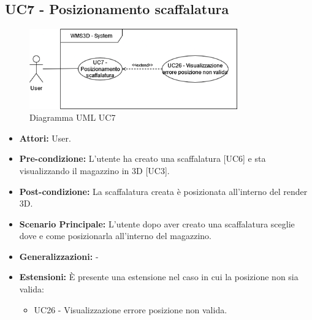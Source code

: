 \subsection{UC7 - Posizionamento scaffalatura}
\begin{figure}[H]
  \centering
  \includegraphics[width=0.8\textwidth]{UC_diagrams_1-10/UC7.drawio.png}
   \caption{Diagramma UML UC7}
\end{figure}
\begin{itemize}
    \item \textbf{Attori:} User.
    \item \textbf{Pre-condizione:}  L'utente ha creato una scaffalatura [UC6] e sta visualizzando il magazzino in 3D [UC3].
    \item \textbf{Post-condizione:} La scaffalatura creata è posizionata all'interno del render 3D.
    \item \textbf{Scenario Principale:} L'utente dopo aver creato una scaffalatura sceglie dove e come posizionarla all'interno del magazzino.
    \item \textbf{Generalizzazioni:} -
    \item \textbf{Estensioni:} È presente una estensione nel caso in cui la posizione non sia valida:
    \begin{itemize}
        \item UC26 - Visualizzazione errore posizione non valida.
    \end{itemize}
\end{itemize}